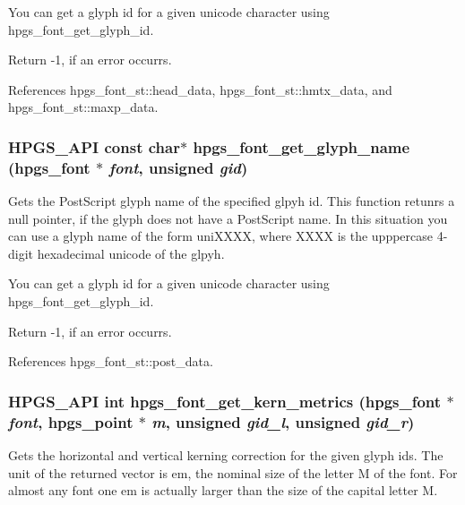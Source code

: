 You can get a glyph id for a given unicode character using {\ttfamily hpgs\_\-font\_\-get\_\-glyph\_\-id}.

Return -\/1, if an error occurrs. 

References hpgs\_\-font\_\-st::head\_\-data, hpgs\_\-font\_\-st::hmtx\_\-data, and hpgs\_\-font\_\-st::maxp\_\-data.

\subsubsection[{hpgs\_\-font\_\-get\_\-glyph\_\-name}]{\setlength{\rightskip}{0pt plus 5cm}HPGS\_\-API const char$\ast$ hpgs\_\-font\_\-get\_\-glyph\_\-name ({\bf hpgs\_\-font} $\ast$ {\em font}, \/  unsigned {\em gid})}\label{group__font_ga85f387b7ff799d031d1f1bf91d441cae}
Gets the PostScript glyph name of the specified glpyh id. This function retunrs a null pointer, if the glyph does not have a PostScript name. In this situation you can use a glyph name of the form {\ttfamily uniXXXX}, where XXXX is the upppercase 4-\/digit hexadecimal unicode of the glpyh.

You can get a glyph id for a given unicode character using {\ttfamily hpgs\_\-font\_\-get\_\-glyph\_\-id}.

Return -\/1, if an error occurrs. 

References hpgs\_\-font\_\-st::post\_\-data.

\subsubsection[{hpgs\_\-font\_\-get\_\-kern\_\-metrics}]{\setlength{\rightskip}{0pt plus 5cm}HPGS\_\-API int hpgs\_\-font\_\-get\_\-kern\_\-metrics ({\bf hpgs\_\-font} $\ast$ {\em font}, \/  {\bf hpgs\_\-point} $\ast$ {\em m}, \/  unsigned {\em gid\_\-l}, \/  unsigned {\em gid\_\-r})}\label{group__font_ga67bd79e5a342c97f302f96edd4064078}
Gets the horizontal and vertical kerning correction for the given glyph ids. The unit of the returned vector is em, the nominal size of the letter M of the font. For almost any font one em is actually larger than the size of the capital letter M.

